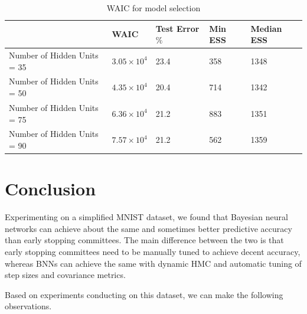 \documentclass[12pt]{report}
\begin{document}
\begin{table}[]
\centering
\begin{tabular}{@{}lllll@{}}
\toprule
               & WAIC & Test Error$\%$ & Min ESS & Median ESS      \\ \midrule
Number of Hidden Units = 35    & $3.05 \times 10^4$  & 23.4    & 358 & 1348   \\ \midrule
Number of Hidden Units = 50  & $4.35 \times 10^4$   & 20.4  & 714  & 1342                \\ \midrule
Number of Hidden Units = 75 &$ 6.36 \times 10^4$   & 21.2  & 883  & 1351                 \\ \midrule
Number of Hidden Units = 90 &$ 7.57 \times 10^4$  & 21.2   & 562  & 1359                 \\ \bottomrule
\end{tabular}
\caption{WAIC for model selection}
\label{my-label}
\end{table}


\section{Conclusion}

Experimenting on a simplified MNIST dataset, we found that Bayesian neural networks can achieve about the same and sometimes better predictive accuracy than early stopping committees. The main difference between the two is that early stopping committees need to be manually  tuned to achieve decent accuracy, whereas BNNs can achieve the same with dynamic HMC and automatic tuning of step sizes and covariance metrics. 

Based on experiments conducting on this dataset, we can make the following observations.
\end{document}
